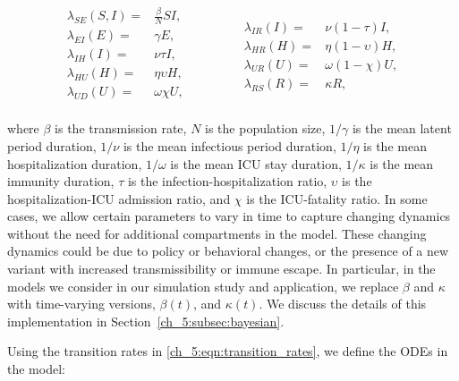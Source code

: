 \begin{equation}
\begin{aligned}
\lambda_{SE}(S, I)  =&  \frac{\beta}{N} S I,   \\
\lambda_{EI}(E)  =& \gamma E,    \\
\lambda_{IH}(I)  =& \nu \tau I,   \\
\lambda_{HU}(H)  =& \eta  \upsilon H,   \\
\lambda_{UD}(U)  =& \omega \chi U, \\
\end{aligned}
\qquad \quad \quad
\begin{aligned}
\lambda_{IR}(I)  =& \nu \left(1 - \tau \right) I,   \\
\lambda_{HR}(H)  =& \eta \left(1 - \upsilon \right) H, \\
\lambda_{UR}(U)  =& \omega \left( 1 - \chi \right) U,    \\
\lambda_{RS}(R)  =& \kappa R,
\end{aligned}
\label{ch_5:eqn:transition_rates}
\end{equation}

where \( \beta \) is the transmission rate, \( N \) is the population size, \( 1 / \gamma  \) is the mean latent period duration, \( 1 / \nu \) is the mean infectious period duration, \( 1 / \eta \) is the mean hospitalization duration, \( 1 / \omega \) is the mean ICU stay duration, \( 1 / \kappa \) is the mean immunity duration, \( \tau \) is the infection-hospitalization ratio, \( \upsilon \) is the hospitalization-ICU admission ratio, and \( \chi \) is the ICU-fatality ratio.
In some cases, we allow certain parameters to vary in time to capture changing dynamics without the need for additional compartments in the model.
These changing dynamics could be due to policy or behavioral changes, or the presence of a new variant with increased transmissibility or immune escape.
In particular, in the models we consider in our simulation study and application, we replace \( \beta \) and \( \kappa \) with time-varying versions, \( \beta(t) \), and \( \kappa(t) \).
We discuss the details of this implementation in Section~\ref{ch_5:subsec:bayesian}.

Using the transition rates in \eqref{ch_5:eqn:transition_rates}, we define the ODEs in the model:

